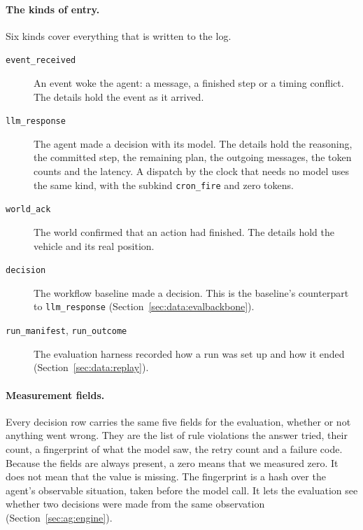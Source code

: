 \paragraph{The kinds of entry.} Six kinds cover everything that is written to
the log.
\begin{description}
  \item[\texttt{event\_received}] An event woke the agent: a message, a
  finished step or a timing conflict. The details hold the event as it arrived.
  \item[\texttt{llm\_response}] The agent made a decision with its model. The
  details hold the reasoning, the committed step, the remaining plan, the
  outgoing messages, the token counts and the latency. A dispatch by the clock
  that needs no model uses the same kind, with the subkind \texttt{cron\_fire}
  and zero tokens.
  \item[\texttt{world\_ack}] The world confirmed that an action had finished.
  The details hold the vehicle and its real position.
  \item[\texttt{decision}] The workflow baseline made a decision. This is the
  baseline's counterpart to \texttt{llm\_response}
  (Section~\ref{sec:data:evalbackbone}).
  \item[\texttt{run\_manifest}, \texttt{run\_outcome}] The evaluation harness
  recorded how a run was set up and how it ended
  (Section~\ref{sec:data:replay}).
\end{description}

\paragraph{Measurement fields.} Every decision row carries the same five
fields for the evaluation, whether or not anything went wrong. They are the
list of rule violations the answer tried, their count, a fingerprint of what
the model saw, the retry count and a failure code. Because the fields are
always present, a zero means that we measured zero. It does not mean that the
value is missing. The fingerprint is a hash over the agent's observable
situation, taken before the model call. It lets the evaluation see whether two
decisions were made from the same observation (Section~\ref{sec:ag:engine}).

